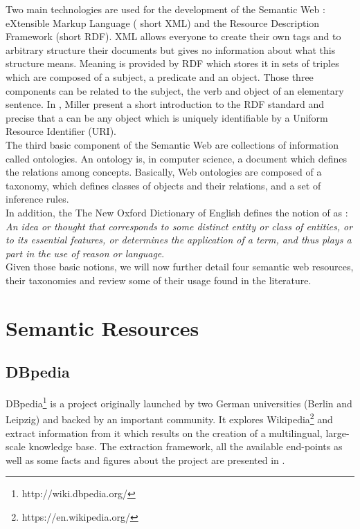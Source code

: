 Two main technologies are used for the development of the Semantic Web : eXtensible Markup Language ( short XML) and the Resource Description Framework (short RDF). XML allows everyone to create their own tags and to arbitrary structure their documents but gives no information about what this structure means. Meaning is provided by RDF which stores it in sets of triples which are composed of a subject, a predicate and an object. Those three components can be related to the subject, the verb and object of an elementary sentence. In \cite{miller1998introduction}, Miller present a short introduction to the RDF standard and precise that a  can be any object which is uniquely identifiable by a Uniform Resource Identifier (URI).\\

The third basic component of the Semantic Web are collections of information called ontologies. An ontology is, in computer science, a document which defines the relations among concepts. Basically, Web ontologies are composed of a taxonomy, which defines classes of objects and their relations, and a set of inference rules.\\

In addition, the The New Oxford Dictionary of English defines the notion of  as : \emph{An idea or thought that corresponds to some distinct entity or class of entities, or to its essential features, or determines the application of a term, and thus plays a part in the use of reason or language}.\\

Given those basic notions, we will now further detail four semantic web resources, their taxonomies and review some of their usage found in the literature.

\section{Semantic Resources} %
\label{sec:semantic_resources}
\subsection{DBpedia} %
\label{sub:dbpedia}

DBpedia\footnote{http://wiki.dbpedia.org/} is a project originally launched by two German universities (Berlin and Leipzig) and backed by an important community. It explores Wikipedia\footnote{https://en.wikipedia.org/} and extract information from it which results on the creation of a multilingual, large-scale knowledge base. The extraction framework, all the available end-points as well as some facts and figures about the project are presented in \cite{lehmann2014dbpedia}.\\

